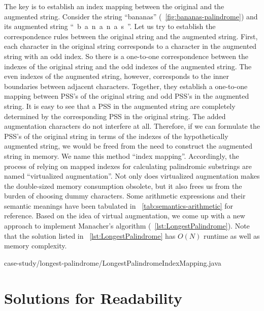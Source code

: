 The key is to establish an index mapping between the original and the augmented string.
Consider the string \mbox{``bananas''} (~\autoref{fig:bananas-palindrome}) and its augmented string
\mbox{`` b a n a n a s ''}.
Let us try to establish the correspondence rules between the original string and the augmented
string.
First, each character in the original string corresponds to a character in the
augmented string with an odd index.
So there is a one-to-one correspondence between the
indexes of the original string and the odd indexes of the augmented string.
The even indexes of the augmented string, however, corresponds to the inner boundaries between
adjacent characters.
Together, they establish a one-to-one mapping between PSS's of the original string and odd
PSS's in the augmented string.
It is easy to see that a PSS in the
augmented string are completely determined by the corresponding PSS in the original string.
The added augmentation characters do not interfere at all.
Therefore, if we can formulate the PSS's of the original string in terms of the indexes of
the hypothetically augmented string, we would be freed from the need to construct the augmented
string in memory.
We name this method ``index mapping''.
Accordingly, the process of relying on mapped indexes for calculating
palindromic substrings are named ``virtualized augmentation''.
Not only does virtualized augmentation makes the double-sized memory consumption obsolete,
but it also frees us from the burden of choosing dummy characters.
Some arithmetic expressions and their semantic meanings have been tabulated in
~\autoref{tab:semantics-arithmetic} for reference.
Based on the idea of virtual augmentation, we come up with a new approach to implement
Manacher's algorithm (~\autoref{lst:LongestPalindrome}).
Note that the solution listed in ~\autoref{lst:LongestPalindrome} has
$O(N)$ runtime as well as memory complexity.

\begin{clisting}[H]
    
    {case-study/longest-palindrome/LongestPalindromeIndexMapping.java}
\end{clisting}

\section{Solutions for Readability}\label{sec:palindrom.modularized}

